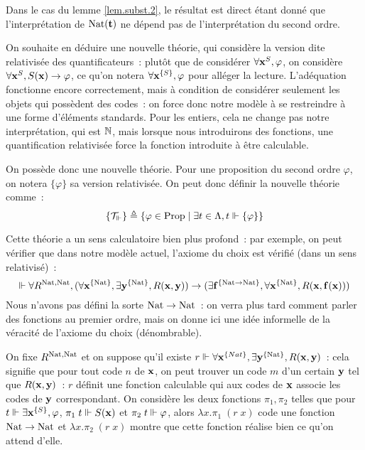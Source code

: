 \documentclass{article}
\begin{document}
Dans le cas du lemme \ref{lem.subst.2}, le résultat est direct étant donné que l'interprétation de $\mathrm{Nat}(\mathbf{t})$ ne dépend pas de l'interprétation du second ordre.

On souhaite en déduire une nouvelle théorie, qui considère la version dite relativisée des quantificateurs~: plutôt que de considérer $\forall \mathbf{x}^S, \varphi$, on considère $\forall \mathbf{x}^S, S(\mathbf{x}) \to \varphi$, ce qu'on notera $\forall \mathbf{x}^{\{S\}}, \varphi$ pour alléger la lecture. L'adéquation fonctionne encore correctement, mais à condition de considérer seulement les objets qui possèdent des codes~: on force donc notre modèle à se restreindre à une forme d'éléments standards. Pour les entiers, cela ne change pas notre interprétation, qui est $\mathbb{N}$, mais lorsque nous introduirons des fonctions, une quantification relativisée force la fonction introduite à être calculable.

On possède donc une nouvelle théorie. Pour une proposition du second ordre $\varphi$, on notera $\{\varphi\}$ sa version relativisée. On peut donc définir la nouvelle théorie comme~:
\[\{\mathcal T_\Vdash\} \triangleq \{\varphi \in \mathrm{Prop}\mid \exists t \in \Lambda, t \Vdash\{\varphi\}\}\]

Cette théorie a un sens calculatoire bien plus profond~: par exemple, on peut vérifier que dans notre modèle actuel, l'axiome du choix est vérifié (dans un sens relativisé)~:
\[\Vdash \forall R^{\mathrm{Nat},\mathrm{Nat}},(\forall \mathbf{x}^{\{\mathrm{Nat}\}}, \exists \mathbf{y}^{\{\mathrm{Nat}\}}, R(\mathbf{x},\mathbf{y}))\to (\exists \mathbf{f}^{\{\mathrm{Nat}\to\mathrm{Nat}\}}, \forall \mathbf{x}^{\{\mathrm{Nat}\}}, R(\mathbf{x},\mathbf{f}(\mathbf{x})))\]
Nous n'avons pas défini la sorte $\mathrm{Nat}\to\mathrm{Nat}$~: on verra plus tard comment parler des fonctions au premier ordre, mais on donne ici une idée informelle de la véracité de l'axiome du choix (dénombrable).

On fixe $R^{\mathrm{Nat},\mathrm{Nat}}$ et on suppose qu'il existe $r\Vdash \forall \mathbf{x}^{\{Nat\}}, \exists \mathbf{y}^{\{\mathrm{Nat}\}}, R(\mathbf{x},\mathbf{y})$~: cela signifie que pour tout code $n$ de $\mathbf{x}$, on peut trouver un code $m$ d'un certain $\mathbf{y}$ tel que $R(\mathbf{x},\mathbf{y})$~: $r$ définit une fonction calculable qui aux codes de $\mathbf{x}$ associe les codes de $\mathbf{y}$ correspondant. On considère les deux fonctions $\pi_1,\pi_2$ telles que pour $t \Vdash \exists \mathbf{x}^{\{S\}}, \varphi$, $\pi_1\;t\Vdash S(\mathbf{x})$ et $\pi_2\;t\Vdash \varphi$, alors $\lambda x.\pi_1\;(r\;x)$ code une fonction $\mathrm{Nat}\to\mathrm{Nat}$ et $\lambda x.\pi_2\;(r\;x)$ montre que cette fonction réalise bien ce qu'on attend d'elle.
\end{document}
